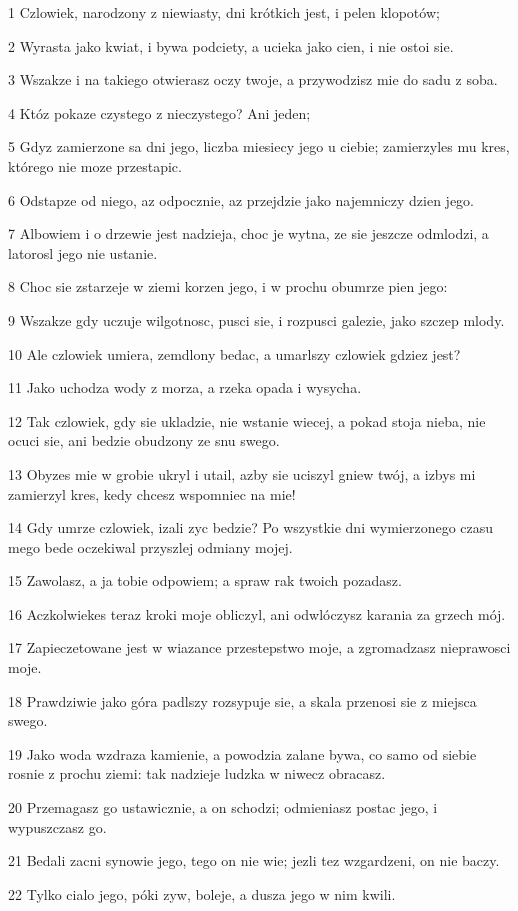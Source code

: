 \par 1 Czlowiek, narodzony z niewiasty, dni krótkich jest, i pelen klopotów;
\par 2 Wyrasta jako kwiat, i bywa podciety, a ucieka jako cien, i nie ostoi sie.
\par 3 Wszakze i na takiego otwierasz oczy twoje, a przywodzisz mie do sadu z soba.
\par 4 Któz pokaze czystego z nieczystego? Ani jeden;
\par 5 Gdyz zamierzone sa dni jego, liczba miesiecy jego u ciebie; zamierzyles mu kres, którego nie moze przestapic.
\par 6 Odstapze od niego, az odpocznie, az przejdzie jako najemniczy dzien jego.
\par 7 Albowiem i o drzewie jest nadzieja, choc je wytna, ze sie jeszcze odmlodzi, a latorosl jego nie ustanie.
\par 8 Choc sie zstarzeje w ziemi korzen jego, i w prochu obumrze pien jego:
\par 9 Wszakze gdy uczuje wilgotnosc, pusci sie, i rozpusci galezie, jako szczep mlody.
\par 10 Ale czlowiek umiera, zemdlony bedac, a umarlszy czlowiek gdziez jest?
\par 11 Jako uchodza wody z morza, a rzeka opada i wysycha.
\par 12 Tak czlowiek, gdy sie ukladzie, nie wstanie wiecej, a pokad stoja nieba, nie ocuci sie, ani bedzie obudzony ze snu swego.
\par 13 Obyzes mie w grobie ukryl i utail, azby sie uciszyl gniew twój, a izbys mi zamierzyl kres, kedy chcesz wspomniec na mie!
\par 14 Gdy umrze czlowiek, izali zyc bedzie? Po wszystkie dni wymierzonego czasu mego bede oczekiwal przyszlej odmiany mojej.
\par 15 Zawolasz, a ja tobie odpowiem; a spraw rak twoich pozadasz.
\par 16 Aczkolwiekes teraz kroki moje obliczyl, ani odwlóczysz karania za grzech mój.
\par 17 Zapieczetowane jest w wiazance przestepstwo moje, a zgromadzasz nieprawosci moje.
\par 18 Prawdziwie jako góra padlszy rozsypuje sie, a skala przenosi sie z miejsca swego.
\par 19 Jako woda wzdraza kamienie, a powodzia zalane bywa, co samo od siebie rosnie z prochu ziemi: tak nadzieje ludzka w niwecz obracasz.
\par 20 Przemagasz go ustawicznie, a on schodzi; odmieniasz postac jego, i wypuszczasz go.
\par 21 Bedali zacni synowie jego, tego on nie wie; jezli tez wzgardzeni, on nie baczy.
\par 22 Tylko cialo jego, póki zyw, boleje, a dusza jego w nim kwili.

